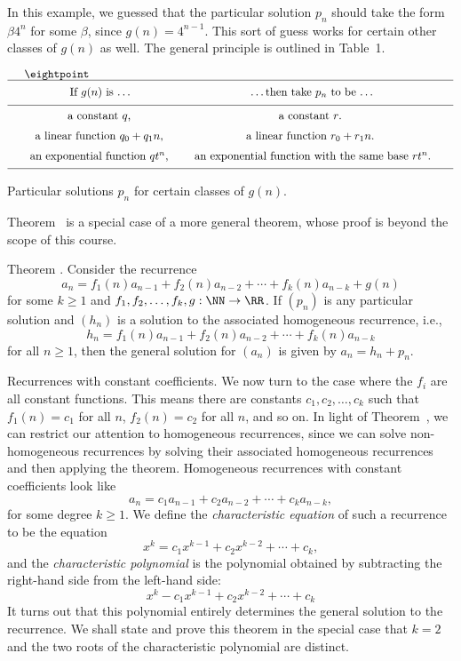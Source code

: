 In this example, we guessed that the particular solution
$p_n$ should take the form $\beta 4^n$ for some $\beta$, since $g(n) = 4^{n-1}$. This sort of
guess works for certain other classes of $g(n)$ as well. The general principle is outlined in Table~1.

\topinsert
$$\vcenter{\vbox{
\eightpoint
\tabskip=2em plus2em minus.5em
\halign{
\hfil#\hfil & \hfil#\hfil \cr
\noalign{\hrule}
\noalign{\medskip}
If $g(n)$ is \dots & \dots then take $p_n$ to be \dots \cr
\noalign{\medskip}
\noalign{\hrule}
\noalign{\medskip}
a constant $q$, & a constant $r$. \cr
\noalign{\medskip}
a linear function $q_0 + q_1n$, & a linear function $r_0 + r_1 n$. \cr
\noalign{\medskip}
an exponential function $qt^n$, & an exponential function with the same base $rt^n$.\cr
\noalign{\medskip}
\noalign{\hrule}
}
}}$$
\vskip5pt
{\centerline{Particular solutions $p_n$ for certain classes of $g(n)$.}}
\bigskip
\endinsert\goodbreak

Theorem~{\thmnonhomoone} is a special case of a more general theorem, whose proof is beyond the
scope of this course.

\edef\thmnonhomo{\the\thmcount}
\proclaim Theorem \advthm. Consider the recurrence
$$ a_n = f_1(n) a_{n-1} + f_2(n)a_{n-2} + \cdots + f_k(n) a_{n-k} + g(n)$$
for some $k\ge 1$ and $f_1, f_2,\ldots, f_k,g : \NN\to \RR$. If $(p_n)$ is any particular solution
and $(h_n)$ is a solution to the associated homogeneous recurrence, i.e.,
$$h_n = f_1(n) a_{n-1} + f_2(n)a_{n-2} + \cdots + f_k(n) a_{n-k}$$
for all $n\ge 1$, then the general solution for $(a_n)$ is given by $a_n = h_n + p_n$.\slug

\bye

\medskip\boldlabel{} Recurrences with constant coefficients.
We now turn to the case where the $f_i$ are all constant functions. This means
there are constants $c_1, c_2, \ldots, c_k$ such that $f_1(n) = c_1$ for all $n$,
$f_2(n) = c_2$ for all $n$, and so on.
In light of Theorem~{\thmnonhomo}, we can
restrict our attention to homogeneous recurrences, since we can solve non-homogeneous
recurrences by solving their associated homogeneous recurrences and then applying the theorem.
Homogeneous recurrences with constant coefficients look like
$$a_n = c_1 a_{n-1} + c_2 a_{n-2} + \cdots + c_k a_{n-k},$$
for some degree $k\ge 1$. We define the {\it characteristic equation} of such a recurrence to be the
equation
$$x^k = c_1 x^{k-1} + c_2 x^{k-2} + \cdots + c_k,$$
and the {\it characteristic polynomial} is the polynomial obtained by subtracting
the right-hand side from the left-hand side:
$$x^k - c_1 x^{k-1} + c_2 x^{k-2} + \cdots + c_k$$
It turns out that this
polynomial entirely determines the general solution to the recurrence. We shall state
and prove this theorem in the special case that $k=2$ and the two roots of the characteristic
polynomial are distinct.

